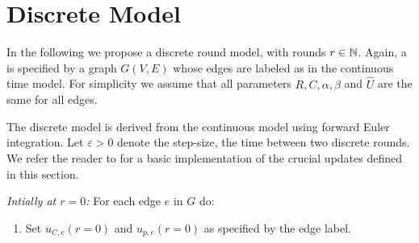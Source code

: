 
\section{Discrete Model}\label{sec:discrete}

In the following we propose a discrete round model, with rounds $r \in \mathbb{N}$.
Again, a \Pn is specified by a graph $G(V,E)$ whose edges are labeled as in the continuous time model.
For simplicity we assume that all parameters $R,C,\alpha,\beta$ and $\hat{U}$ are the same for all edges.

The discrete model is derived from the continuous model using forward Euler integration. Let $\varepsilon > 0$ denote the step-size, \ie the time between two discrete rounds. We refer the reader to  for a basic implementation of the crucial updates defined in this section.

\medskip

\noindent
{\em Intially at $r=0$:}
For each edge $e$ in $G$ do:  
\begin{enumerate}
\item Set $u_{C,e}(r=0)$ and $u_{p,e}(r=0)$ as specified by the edge label.
\end{enumerate}

\medskip


